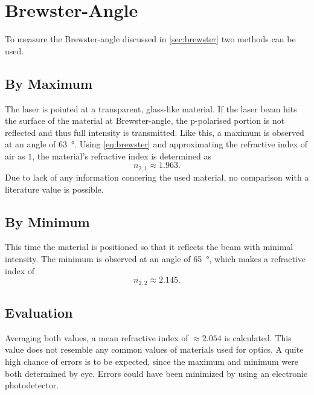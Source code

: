 \chapter{Brewster-Angle}
To measure the Brewster-angle discussed in \autoref{sec:brewster} two methods can be used.

\section{By Maximum}
The laser is pointed at a transparent, glass-like material.
If the laser beam hits the surface of the material at Brewster-angle, the p-polarised portion is not reflected and thus full intensity is transmitted.
Like this, a maximum is observed at an angle of \SI{63}{\degree}.
Using \autoref{eq:brewster} and approximating the refractive index of air as $1$, the material's refractive index is determined as
\begin{equation*}
	n_{2,1}\approx\num{1.963}.
\end{equation*}
Due to lack of any information concering the used material, no comparison with a literature value is possible.

\section{By Minimum}
This time the material is positioned so that it reflects the beam with minimal intensity.
The minimum is observed at an angle of \SI{65}{\degree}, which makes a refractive index of
\begin{equation*}
	n_{2,2}\approx\num{2.145}.
\end{equation*}

\section{Evaluation}
Averaging both values, a mean refractive index of $\approx\num{2.054}$ is calculated.
This value does not resemble any common values of materials used for optics.
A quite high chance of errors is to be expected, since the maximum and minimum were both determined by eye.
Errors could have been minimized by using an electronic photodetector.
